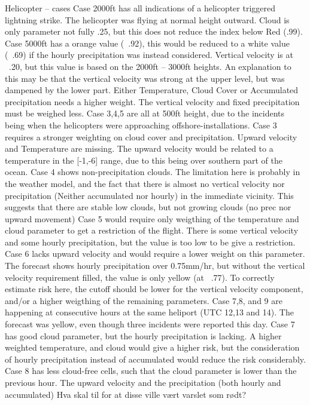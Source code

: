 Helicopter – cases
Case 2000ft has all indications of a helicopter triggered lightning strike. The helicopter was flying at normal height outward. Cloud is only parameter not fully .25, but this does not reduce the index below Red (.99).
Case 5000ft has a orange value (~.92), this would be reduced to a white value (~.69) if the hourly precipitation was instead considered. Vertical velocity is at ~.20, but this value is based on the 2000ft – 3000ft heights. An explanation to this may be that the vertical velocity was strong at the upper level, but was dampened by the lower part. Either Temperature, Cloud Cover or Accumulated precipitation needs a higher weight. The vertical velocity and fixed precipitation must be weighed less.
Case 3,4,5 are all at 500ft height, due to the incidents being when the helicopters were approaching offshore-installations. 
Case 3 requires a stronger weighting on cloud cover and precipitation. Upward velocity and Temperature are missing. The upward velocity would be related to a temperature in the  [-1,-6] range, due to this being over  southern part of the ocean.
Case 4 shows non-precipitation clouds. The limitation here is probably in the weather model, and the fact that there is almost no vertical velocity nor precipitation (Neither accumulated nor hourly) in the immediate vicinity. This suggests that there are stable low clouds, but not growing clouds (no prec nor upward movement)
Case 5 	would require only weigthing of the temperature and  cloud parameter to get a restriction of the flight. There is some vertical velocity and some hourly precipitation, but the value is too low to be give a restriction.
Case 6 lacks upward velocity and would require a lower weight on this parameter. The forecast shows hourly precipitation over 0.75mm/hr, but without the vertical velocity requirement filled, the value is only yellow (at ~.77). To correctly estimate risk here, the cutoff should be lower for the vertical velocity component, and/or a higher weigthing of the remaining parameters.
Case 7,8, and 9 are happening at consecutive hours at the same heliport (UTC 12,13 and 14). The forecast was yellow, even though three incidents were reported this day.
Case 7 has good cloud parameter, but the hourly precipitation is lacking. A higher weighted temperature, and cloud would give a higher risk, but the consideration of hourly precipitation instead of accumulated would reduce the risk considerably.
Case 8 has less cloud-free cells, such that the cloud parameter is lower than the previous hour. The upward velocity and the precipitation (both hourly and accumulated) 
Hva skal til for at disse ville vært varslet som rødt?

